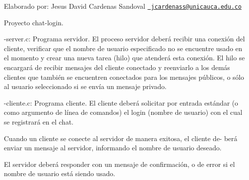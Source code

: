 Elaborado por\+: Jesus David Cardenas Sandoval \href{mailto:jcardenass@unicauca.edu.co}{\texttt{ jcardenass@unicauca.\+edu.\+co}}

Proyecto chat-\/login.

-\/server.\+c\+: Programa servidor. El proceso servidor deberá recibir una conexión del cliente, verificar que el nombre de usuario especificado no se encuentre usado en el momento y crear una nueva tarea (hilo) que atenderá esta conexión. El hilo se encargará de recibir mensajes del cliente conectado y reenviarlo a los demás clientes que también se encuentren conectados para los mensajes públicos, o sólo al usuario seleccionado si se envía un mensaje privado.

-\/cliente.\+c\+: Programa cliente. El cliente deberá solicitar por entrada estándar (o como argumento de línea de comandos) el login (nombre de usuario) con el cual se registrará en el chat.

Cuando un cliente se conecte al servidor de manera exitosa, el cliente de-\/ berá enviar un mensaje al servidor, informando el nombre de usuario deseado.

El servidor deberá responder con un mensaje de confirmación, o de error si el nombre de usuario está siendo usado. 